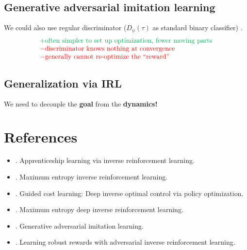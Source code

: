 \subsection{Generative adversarial imitation learning}
We could also use regular discriminator ($D_\psi(\tau)$ as standard binary classifier) \cite{ho2016generative}.
\[\begin{matrix*}[l]
	\color{Green}+ \text{often simpler to set up optimization, fewer moving parts}\\
	\color{red}- \text{discriminator knows nothing at convergence}\\
	\color{red}- \text{generally cannot re-optimize the “reward”}
\end{matrix*}\]

\subsection{Generalization via IRL}
We need to decouple the \textbf{goal} from the \textbf{dynamics!} \cite{fu2017learning}

\section{References}
\begin{itemize}
	\item {}. Apprenticeship learning via inverse reinforcement learning.
	\item {}. Maximum entropy inverse reinforcement learning.
\end{itemize}

\begin{itemize}
	\item {}. Guided cost learning: Deep inverse optimal control via policy optimization.
	\item {}. Maximum entropy deep inverse reinforcement learning.
	\item {}. Generative adversarial imitation learning.
	\item {}. Learning robust rewards with adversarial inverse reinforcement learning.
\end{itemize}